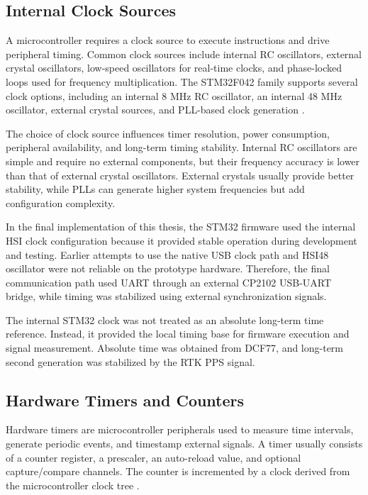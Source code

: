 \subsection{Internal Clock Sources}

A microcontroller requires a clock source to execute instructions and drive peripheral timing. Common clock sources include internal RC oscillators, external crystal oscillators, low-speed oscillators for real-time clocks, and phase-locked loops used for frequency multiplication. The STM32F042 family supports several clock options, including an internal 8 MHz RC oscillator, an internal 48 MHz oscillator, external crystal sources, and PLL-based clock generation \cite{stm32F042Datasheet,stm32F0ReferenceManual}.

The choice of clock source influences timer resolution, power consumption, peripheral availability, and long-term timing stability. Internal RC oscillators are simple and require no external components, but their frequency accuracy is lower than that of external crystal oscillators. External crystals usually provide better stability, while PLLs can generate higher system frequencies but add configuration complexity.

In the final implementation of this thesis, the STM32 firmware used the internal HSI clock configuration because it provided stable operation during development and testing. Earlier attempts to use the native USB clock path and HSI48 oscillator were not reliable on the prototype hardware. Therefore, the final communication path used UART through an external CP2102 USB-UART bridge, while timing was stabilized using external synchronization signals.

The internal STM32 clock was not treated as an absolute long-term time reference. Instead, it provided the local timing base for firmware execution and signal measurement. Absolute time was obtained from DCF77, and long-term second generation was stabilized by the RTK PPS signal.

\subsection{Hardware Timers and Counters}

Hardware timers are microcontroller peripherals used to measure time intervals, generate periodic events, and timestamp external signals. A timer usually consists of a counter register, a prescaler, an auto-reload value, and optional capture/compare channels. The counter is incremented by a clock derived from the microcontroller clock tree \cite{stm32F0ReferenceManual}.

